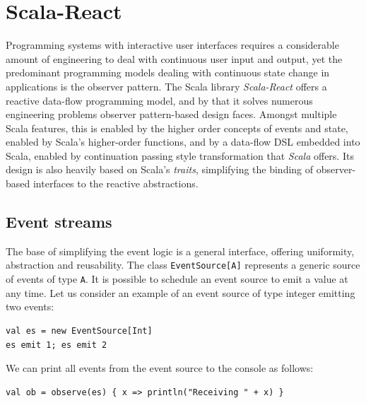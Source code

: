 


\section{Scala-React}\label{sec:scala-react}

Programming systems with interactive user interfaces requires a considerable amount of engineering to deal with continuous user input and output, yet the predominant programming models dealing with continuous state change in applications is the observer pattern. The Scala library \emph{Scala-React} offers a reactive data-flow programming model, and by that it solves numerous engineering problems observer pattern-based design faces. Amongst multiple Scala features, this is enabled by the higher order concepts of events and state, enabled by Scala's higher-order functions, and by a data-flow DSL embedded into Scala, enabled by continuation passing style transformation that \emph{Scala} offers. Its design is also heavily based on Scala's \emph{traits}, simplifying the binding of observer-based interfaces to the reactive abstractions.\cite{DeprecatingObservers}

\subsection{Event streams}

The base of simplifying the event logic is a general interface, offering uniformity, abstraction and reusability. The class {\tt EventSource[A]} represents a generic source of events of type {\tt A}. It is possible to schedule an event source to emit a value at any time. Let us consider an example of an event source of type integer emitting two events:
\begin{lstlisting}
val es = new EventSource[Int]
es emit 1; es emit 2
\end{lstlisting}

We can print all events from the event source to the console as follows:
\begin{lstlisting}
val ob = observe(es) { x => println("Receiving " + x) }
\end{lstlisting}

